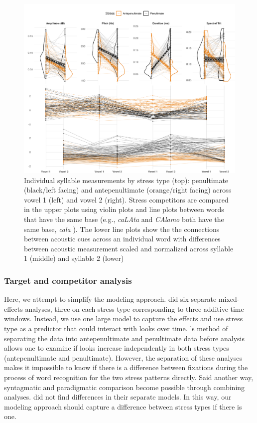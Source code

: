 \begin{figure}[H]
  \centering
  \includegraphics[width=1\linewidth]{visuals/raw_acoustics_combined.jpeg}
  \caption{Individual syllable measurements by stress type (top): penultimate (black/left facing) and antepenultimate (orange/right facing)  across vowel 1 (left) and vowel 2 (right). Stress competitors are compared in the upper plots using violin plots and line plots between words that have the same base (e.g., \textit{caLAta} and \textit{CAlamo} both have the same base, \textit{cala} ). The lower line plots show the the connections between acoustic cues across an individual word with differences between acoustic measurement scaled and normalized across syllable 1 (middle) and syllable 2 (lower)}
  \label{fig:raw_acoustics}
\end{figure}


\subsubsection{Target and competitor analysis}
Here, we attempt to simplify the modeling approach. \cite{Sulpizio_McQueen_2012} did six separate mixed-effects analyses, three on each stress type corresponding to three additive time windows. Instead, we use one large model to capture the effects and use stress type as a predictor that could interact with looks over time. \cite{Sulpizio_McQueen_2012}'s method of separating the data into antepenultimate and penultimate data before analysis allows one to examine if looks increase independently in both stress types (antepenultimate and penultimate). However, the separation of these analyses makes it impossible to know if there is a difference between fixations during the process of word recognition for the two stress patterns directly. Said another way, syntagmatic and paradigmatic comparison become possible through combining analyses. \cite{Sulpizio_McQueen_2012} did not find differences in their separate models. In this way, our modeling approach should capture a difference between stress types if there is one. 

